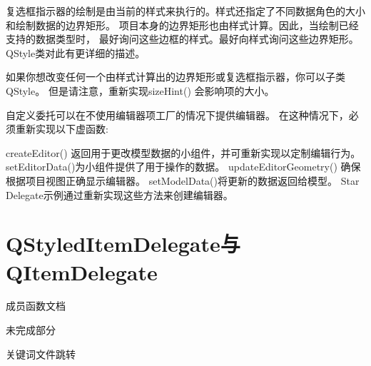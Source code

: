 复选框指示器的绘制是由当前的样式来执行的。样式还指定了不同数据角色的大小和绘制数据的边界矩形。
项目本身的边界矩形也由样式计算。因此，当绘制已经支持的数据类型时，
最好询问这些边框的样式。最好向样式询问这些边界矩形。
QStyle类对此有更详细的描述。

如果你想改变任何一个由样式计算出的边界矩形或复选框指示器，你可以子类QStyle。
但是请注意，重新实现sizeHint() 会影响项的大小。

自定义委托可以在不使用编辑器项工厂的情况下提供编辑器。
在这种情况下，必须重新实现以下虚函数:

createEditor() 返回用于更改模型数据的小组件，并可重新实现以定制编辑行为。 
setEditorData()为小组件提供了用于操作的数据。 
updateEditorGeometry() 确保根据项目视图正确显示编辑器。 
setModelData()将更新的数据返回给模型。
Star Delegate示例通过重新实现这些方法来创建编辑器。

\section{QStyledItemDelegate与QItemDelegate}

成员函数文档

未完成部分

关键词文件跳转